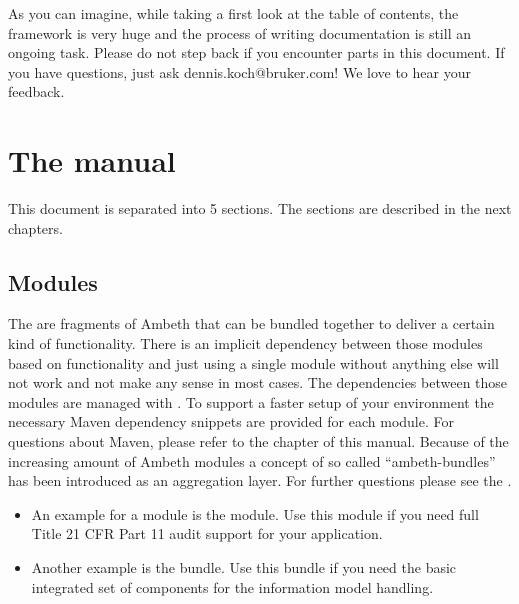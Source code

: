 As you can imagine, while taking a first look at the table of contents, the framework is very huge and the process of writing documentation is still an ongoing task. Please do not step back if you encounter \TODO parts in this document. If you have questions, just ask dennis.koch@bruker.com! We love to hear your feedback.

\section{The manual}
This document is separated into 5 sections. The sections are described in the next chapters.
\subsection{Modules}

The  are fragments of Ambeth that can be bundled together to deliver a certain kind of functionality. There is an implicit dependency between those modules based on functionality and just using a single module without anything else will not work and not make any sense in most cases. The dependencies between those modules are managed with . To support a faster setup of your environment the
necessary Maven dependency snippets are provided for each module. For questions about Maven, please refer to the  chapter of this manual. Because of the increasing amount of Ambeth modules a concept of so called ``ambeth-bundles'' has been introduced as an aggregation layer. For further questions please see the .

\begin{itemize}
  \item An example for a module is the  module. Use this module if you need full  Title 21 CFR Part 11 audit support for your application.
  \item Another example is the  bundle. Use this bundle if you need the basic integrated set of components for the information model handling.
\end{itemize}

\def\showimgref{img/platform-overview.png}


